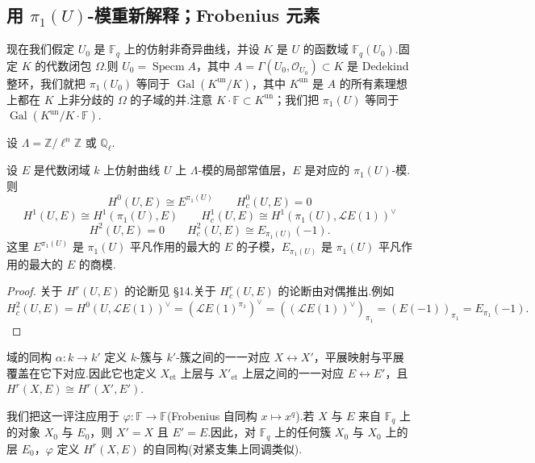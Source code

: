 \subsection*{\texorpdfstring{用 $\pi_1(U)$-模重新解释；Frobenius 元素}{用 pi_1(U)-模重新解释；Frobenius 元素}}

现在我们假定 $U_0$ 是 $\mathbb{F}_q$ 上的仿射非奇异曲线，并设 $K$ 是 $U$ 的函数域 $\mathbb{F}_q(U_0)$.固定 $K$ 的代数闭包 $\Omega$.则 $U_0 = \operatorname{Specm} A$，其中 $A = \Gamma(U_0, \mathcal{O}_{U_0}) \subset K$ 是 Dedekind 整环，我们就把 $\pi_1(U_0)$ 等同于 $\operatorname{Gal}(K^{\mathrm{un}}/K)$，其中 $K^{\mathrm{un}}$ 是 $A$ 的所有素理想上都在 $K$ 上非分歧的 $\Omega$ 的子域的并.注意 $K \cdot \mathbb{F} \subset K^{\mathrm{un}}$；我们把 $\pi_1(U)$ 等同于 $\operatorname{Gal}(K^{\mathrm{un}}/K \cdot \mathbb{F})$.

设 $\Lambda = \mathbb{Z}/\ell^{n}\mathbb{Z}$ 或 $\mathbb{Q}_{\ell}$.

\begin{proposition}\label{prop:29.9}
设 $E$ 是代数闭域 $k$ 上仿射曲线 $U$ 上 $\Lambda$-模的局部常值层，$E$ 是对应的 $\pi_1(U)$-模.则
\[
H^{0}(U, E) \cong E^{\pi_1(U)} \qquad H^{0}_{c}(U, E) = 0
\]
\[
H^{1}(U, E) \cong H^{1}(\pi_1(U), E) \qquad H^{1}_{c}(U, E) \cong H^{1}(\pi_1(U), \mathcal{L}E(1))^{\vee}
\]
\[
H^{2}(U, E) = 0 \qquad H^{2}_{c}(U, E) \cong E_{\pi_1(U)}(-1).
\]
这里 $E^{\pi_1(U)}$ 是 $\pi_1(U)$ 平凡作用的最大的 $E$ 的子模，$E_{\pi_1(U)}$ 是 $\pi_1(U)$ 平凡作用的最大的 $E$ 的商模.
\end{proposition}

\begin{proof}
关于 $H^{r}(U, E)$ 的论断见 \S 14.关于 $H^{r}_{c}(U, E)$ 的论断由对偶推出.例如
\[
H^{2}_{c}(U, E) = H^{0}(U, \mathcal{L}E(1))^{\vee} = (\mathcal{L}E(1)^{\pi_1})^{\vee} = ((\mathcal{L}E(1))^{\vee})_{\pi_1} = (E(-1))_{\pi_1} = E_{\pi_1}(-1).
\]
\end{proof}

域的同构 $\alpha \colon k \to k'$ 定义 $k$-簇与 $k'$-簇之间的一一对应 $X \leftrightarrow X'$，平展映射与平展覆盖在它下对应.因此它也定义 $X_{\mathrm{et}}$ 上层与 $X'_{\mathrm{et}}$ 上层之间的一一对应 $E \leftrightarrow E'$，且 $H^{r}(X, E) \cong H^{r}(X', E')$.

我们把这一评注应用于 $\varphi \colon \mathbb{F} \to \mathbb{F}$(Frobenius 自同构 $x \mapsto x^{q}$).若 $X$ 与 $E$ 来自 $\mathbb{F}_q$ 上的对象 $X_0$ 与 $E_0$，则 $X' = X$ 且 $E' = E$.因此，对 $\mathbb{F}_q$ 上的任何簇 $X_0$ 与 $X_0$ 上的层 $E_0$，$\varphi$ 定义 $H^{r}(X, E)$ 的自同构(对紧支集上同调类似).

